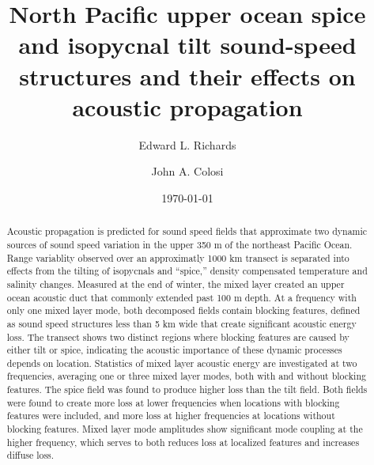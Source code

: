\documentclass[preprint,NumberedRefs]{JASA}
\begin{document}
\title[Mixed layer tilt and spice]{North Pacific upper ocean spice and isopycnal tilt sound-speed structures and their effects on acoustic propagation}
\author{Edward L. Richards}
\author{John A. Colosi}


\date{\today}


\begin{abstract}
Acoustic propagation is predicted for sound speed fields that approximate two dynamic sources of sound speed variation in the upper 350 m of the northeast Pacific Ocean. Range variablity observed over an approximatly 1000 km transect is separated into effects from the tilting of isopycnals and “spice,” density compensated temperature and salinity changes. Measured at the end of winter, the mixed layer created an upper ocean acoustic duct that commonly extended past 100 m depth. At a frequency with only one mixed layer mode, both decomposed fields contain blocking features, defined as sound speed structures less than 5 km wide that create significant acoustic energy loss. The transect shows two distinct regions where blocking features are caused by either tilt or spice, indicating the acoustic importance of these dynamic processes depends on location. Statistics of mixed layer acoustic energy are investigated at two frequencies, averaging one or three mixed layer modes, both with and without blocking features. The spice field was found to produce higher loss than the tilt field. Both fields were found to create more loss at lower frequencies when locations with blocking features were included, and more loss at higher frequencies at locations without blocking features. Mixed layer mode amplitudes show significant mode coupling at the higher frequency, which serves to both reduces loss at localized features and increases diffuse loss.

\end{abstract}

\maketitle
\end{document}
